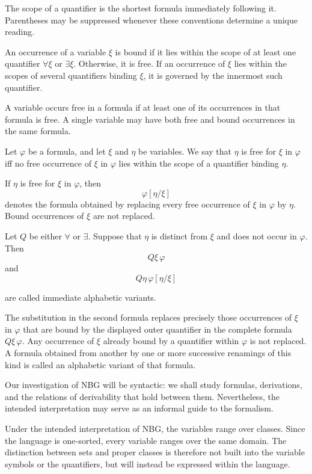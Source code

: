 The scope of a quantifier is the shortest formula immediately following it. Parentheses may be suppressed whenever these conventions determine a unique reading.

An occurrence of a variable $\xi$ is bound if it lies within the scope of at least one quantifier $\forall \xi$ or $\exists \xi$. Otherwise, it is free. If an occurrence of \(\xi\) lies within the scopes of several quantifiers binding \(\xi\), it is governed by the innermost such quantifier.

A variable occurs free in a formula if at least one of its occurrences in that formula is free. A single variable may have both free and bound occurrences in the same formula.

Let \(\varphi\) be a formula, and let \(\xi\) and \(\eta\) be variables. We say that \(\eta\) is free for \(\xi\) in \(\varphi\) iff no free occurrence of \(\xi\) in \(\varphi\) lies within the scope of a quantifier binding \(\eta\).

If \(\eta\) is free for \(\xi\) in \(\varphi\), then
\[
\varphi[\eta/\xi]
\]
denotes the formula obtained by replacing every free occurrence of \(\xi\) in \(\varphi\) by \(\eta\). Bound occurrences of \(\xi\) are not replaced.

Let \(Q\) be either \(\forall\) or \(\exists\). Suppose that \(\eta\) is distinct from \(\xi\) and does not occur in \(\varphi\). Then
\[
Q\xi\,\varphi
\]
and
\[
Q\eta\,\varphi[\eta/\xi]
\]

are called immediate alphabetic variants.

The substitution in the second formula replaces precisely those occurrences of \(\xi\) in \(\varphi\) that are bound by the displayed outer quantifier in the complete formula \(Q\xi\,\varphi\). Any occurrence of \(\xi\) already bound by a quantifier within \(\varphi\) is not replaced. A formula obtained from another by one or more successive renamings of this kind is called an alphabetic variant of that formula.

Our investigation of NBG will be syntactic: we shall study formulas, derivations, and the relations of derivability that hold between them. Nevertheless, the intended interpretation may serve as an informal guide to the formalism.

Under the intended interpretation of NBG, the variables range over classes. Since the language is one-sorted, every variable ranges over the same domain. The distinction between sets and proper classes is therefore not built into the variable symbols or the quantifiers, but will instead be expressed within the language.

